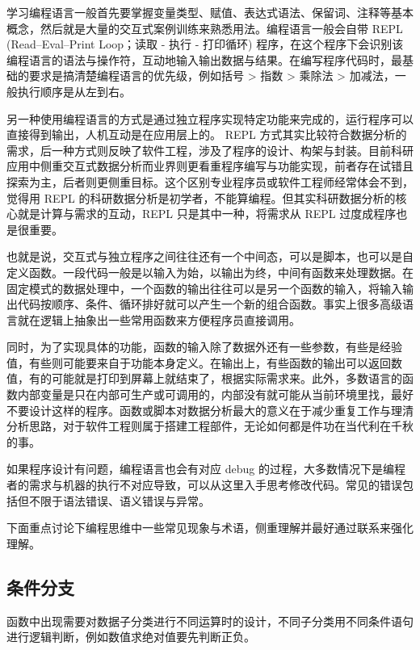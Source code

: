 \documentclass[
]{book}
\begin{document}
学习编程语言一般首先要掌握变量类型、赋值、表达式语法、保留词、注释等基本概念，然后就是大量的交互式案例训练来熟悉用法。编程语言一般会自带 REPL (Read--Eval--Print Loop；读取 - 执行 - 打印循环) 程序，在这个程序下会识别该编程语言的语法与操作符，互动地输入输出数据与结果。在编写程序代码时，最基础的要求是搞清楚编程语言的优先级，例如括号 \textgreater{} 指数 \textgreater{} 乘除法 \textgreater{} 加减法，一般执行顺序是从左到右。

另一种使用编程语言的方式是通过独立程序实现特定功能来完成的，运行程序可以直接得到输出，人机互动是在应用层上的。 REPL 方式其实比较符合数据分析的需求，后一种方式则反映了软件工程，涉及了程序的设计、构架与封装。目前科研应用中侧重交互式数据分析而业界则更看重程序编写与功能实现，前者存在试错且探索为主，后者则更侧重目标。这个区别专业程序员或软件工程师经常体会不到，觉得用 REPL 的科研数据分析是初学者，不能算编程。但其实科研数据分析的核心就是计算与需求的互动，REPL 只是其中一种，将需求从 REPL 过度成程序也是很重要。

也就是说，交互式与独立程序之间往往还有一个中间态，可以是脚本，也可以是自定义函数。一段代码一般是以输入为始，以输出为终，中间有函数来处理数据。在固定模式的数据处理中，一个函数的输出往往可以是另一个函数的输入，将输入输出代码按顺序、条件、循环排好就可以产生一个新的组合函数。事实上很多高级语言就在逻辑上抽象出一些常用函数来方便程序员直接调用。

同时，为了实现具体的功能，函数的输入除了数据外还有一些参数，有些是经验值，有些则可能要来自于功能本身定义。在输出上，有些函数的输出可以返回数值，有的可能就是打印到屏幕上就结束了，根据实际需求来。此外，多数语言的函数内部变量是只在内部可生产或可调用的，内部没有就可能从当前环境里找，最好不要设计这样的程序。函数或脚本对数据分析最大的意义在于减少重复工作与理清分析思路，对于软件工程则属于搭建工程部件，无论如何都是件功在当代利在千秋的事。

如果程序设计有问题，编程语言也会有对应 debug 的过程，大多数情况下是编程者的需求与机器的执行不对应导致，可以从这里入手思考修改代码。常见的错误包括但不限于语法错误、语义错误与异常。

下面重点讨论下编程思维中一些常见现象与术语，侧重理解并最好通过联系来强化理解。

\hypertarget{ux6761ux4ef6ux5206ux652f}{%
\subsection{条件分支}\label{ux6761ux4ef6ux5206ux652f}}

函数中出现需要对数据子分类进行不同运算时的设计，不同子分类用不同条件语句进行逻辑判断，例如数值求绝对值要先判断正负。
\end{document}
